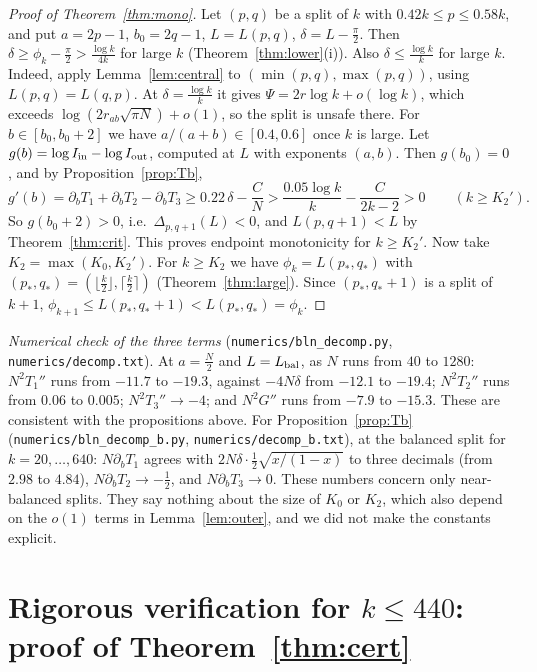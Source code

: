 \documentclass[11pt]{amsart}
\theoremstyle{definition}
\begin{document}
\begin{proof}[Proof of Theorem~\ref{thm:mono}]
Let $(p,q)$ be a split of $k$ with $0.42k\le p\le0.58k$, and put $a=2p-1$, $b_0=2q-1$, $L=L(p,q)$, $\delta=L-\frac\pi2$. Then $\delta\ge\phi_k-\frac\pi2>\frac{\log k}{4k}$
for large $k$ (Theorem~\ref{thm:lower}(i)). Also $\delta\le\frac{\log k}k$ for large $k$. Indeed, apply Lemma~\ref{lem:central} to $(\min(p,q),\max(p,q))$, using $L(p,q)=L(q,p)$.
At $\delta=\frac{\log k}k$ it gives $\Psi=2r\log k+o(\log k)$, which exceeds $\log(2r_{ab}\sqrt{\pi N})+o(1)$, so the split is unsafe there.
For $b\in[b_0,b_0+2]$ we have $a/(a+b)\in[0.4,0.6]$ once $k$ is large. Let $g(b)=\log I_{\rm in}-\log I_{\rm out}$, computed at $L$ with exponents $(a,b)$. Then $g(b_0)=0$, and by
Proposition~\ref{prop:Tb},
\[
g'(b)=\partial_bT_1+\partial_bT_2-\partial_bT_3\ge0.22\,\delta-\frac CN>\frac{0.05\log k}k-\frac C{2k-2}>0\qquad(k\ge K_2').
\]
So $g(b_0+2)>0$, i.e.\ $\Delta_{p,q+1}(L)<0$, and $L(p,q+1)<L$ by Theorem~\ref{thm:crit}. This proves endpoint monotonicity for $k\ge K_2'$.
Now take $K_2=\max(K_0,K_2')$. For $k\ge K_2$ we have $\phi_k=L(p_*,q_*)$ with
$(p_*,q_*)=(\lfloor\frac k2\rfloor,\lceil\frac k2\rceil)$ (Theorem~\ref{thm:large}). Since $(p_*,q_*+1)$ is a split of $k+1$,
$\phi_{k+1}\le L(p_*,q_*+1)<L(p_*,q_*)=\phi_k$.
\end{proof}

\noindent\emph{Numerical check of the three terms} (\texttt{numerics/bln\_decomp.py}, \texttt{numerics/decomp.txt}). At $a=\frac N2$ and $L=L_{\rm bal}$, as $N$ runs from $40$ to $1280$:
$N^2T_1''$ runs from $-11.7$ to $-19.3$, against $-4N\delta$ from $-12.1$ to $-19.4$; $N^2T_2''$ runs from $0.06$ to $0.005$; $N^2T_3''\to-4$; and $N^2G''$ runs from $-7.9$ to $-15.3$.
These are consistent with the propositions above. For Proposition~\ref{prop:Tb} (\texttt{numerics/bln\_decomp\_b.py}, \texttt{numerics/decomp\_b.txt}),
at the balanced split for $k=20,\dots,640$: $N\partial_bT_1$ agrees with $2N\delta\cdot\frac12\sqrt{x/(1-x)}$ to three decimals (from $2.98$ to $4.84$),
$N\partial_bT_2\to-\frac12$, and $N\partial_bT_3\to0$. These numbers concern only near-balanced splits. They say nothing about the size of $K_0$
or $K_2$, which also depend on the $o(1)$ terms in Lemma~\ref{lem:outer}, and we did not make the constants explicit.

\section{Rigorous verification for $k\le440$: proof of Theorem~\ref{thm:cert}}\label{sec:cert}
\end{document}

